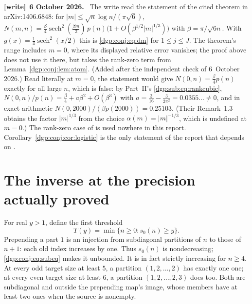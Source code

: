 \documentclass[11pt,letterpaper]{article}
\numberwithin{equation}{section}
\theoremstyle{remark}\newtheorem{remark}[theorem]{Remark}
\newenvironment{writenote}[1][]{\par\smallskip\begingroup\small
 \noindent\textbf{[write]}\if\relax\detokenize{#1}\relax\else~\textbf{#1.}\fi\ }%
 {\par\endgroup\smallskip}
\begin{document}
\begin{writenote}[6 October 2026]
The write read the statement of the cited theorem \cite{dm} in arXiv:1406.6848: for $|m|\le\sqrt n\log n/(\pi\sqrt6)$, $N(m,n)=\frac\beta4\operatorname{sech}^2(\frac{\beta m}2)\,p(n)\bigl(1+O(\beta^{1/2}|m|^{1/3})\bigr)$ with $\beta=\pi/\sqrt{6n}$. With $g(x)=\frac14\operatorname{sech}^2(x/2)$ this is \eqref{dgp:conj:eq:dm} for $1\le j\le J$. The theorem's range includes $m=0$, where its displayed relative error vanishes; the proof above does not use it there, but takes the rank-zero term from Lemma~\ref{dgp:conj:lem:atom}. \textup{(Added after the independent check of 6~October 2026.)} Read literally at $m=0$, the statement would give $N(0,n)=\frac\beta4p(n)$ exactly for all large $n$, which is false: by Part~II's \eqref{dgp:sub:eq:rankcubic}, $N(0,n)/p(n)=\frac\beta4+a\beta^2+O(\beta^3)$ with $a=\frac3{16}-\frac3{2\pi^2}=0.0355\ldots\ne0$, and in exact arithmetic $N(0,2000)/(\beta p(2000))=0.25103$. (Their Remark~1.3 obtains the factor $|m|^{1/3}$ from the choice $\alpha(m)=|m|^{-1/3}$, which is undefined at $m=0$.) The rank-zero case of \cite{dm} is used nowhere in this report. Corollary~\ref{dgp:conj:cor:logistic} is the only statement of the report that depends on \cite{dm}.
\end{writenote}

\section{The inverse at the precision actually proved}\label{dgp:conj:sec:inverse}
For real $y>1$, define the first threshold
\begin{equation}\label{dgp:conj:eq:threshold}
 T(y)=\min\{n\geq0:s_0(n)\geq y\}.
\end{equation}
Prepending a part $1$ is an injection from subdiagonal partitions of
$n$ to those of $n+1$: each old index increases by one. Thus $s_0(n)$
is nondecreasing; \eqref{dgp:conj:eq:subeq} makes it unbounded. It is in fact
strictly increasing for $n\geq4$. At every odd target size at least
$5$, a partition $(1,2,\ldots,2)$ has exactly one one; at every even
target size at least $6$, a partition $(1,2,\ldots,2,3)$ does too.
Both are subdiagonal and outside the prepending map's image, whose
members have at least two ones when the source is nonempty.
\end{document}
